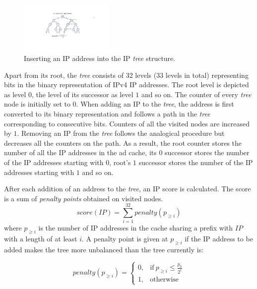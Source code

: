 \begin{figure}
    \centering
    \includegraphics[width=0.40\textwidth]{img/ip_tree_small}
    \vspace{-0.05in}
    \caption{Inserting an IP address into the IP \emph{tree} structure.}
    \label{fig:ip_tree}
    \vspace{-0.15in}
\end{figure}

Apart from its root, the \emph{tree} consists of 32 levels (33 levels in total) representing bits in the binary representation of IPv4 IP addresses. 
The root level is depicted as level $0$, the level of its successor as level $1$ and so on. 
The counter of every \emph{tree} node is initially set to $0$. When adding an IP to the \emph{tree}, the address is first converted to its binary representation and follows a path in the \emph{tree} corresponding to consecutive bits. 
Counters of all the visited nodes are increased by $1$. Removing an IP from the \emph{tree} follows the analogical procedure but decreases all the counters on the path. 
As a result, the root counter stores the number of all the IP addresses in the ad cache, its $0$ successor stores the number of the IP addresses starting with $0$, root's $1$ successor stores the number of the IP addresses starting with $1$ and so on. 

After each addition of an address to the \emph{tree}, an IP score is calculated.
The score is a sum of \emph{penalty points} obtained on visited nodes. 
$$\textit{score}(IP)=\sum_{i=1}^{32} \textit{penalty}(p_{\geq i}) $$
where $p_{\geq i}$ is the number of IP addresses in the cache sharing a prefix with $IP$ with a length of at least $i$. A penalty point is given at $p_{\geq i}$ if the IP address to be added makes the tree more unbalanced than the tree currently is:

\begin{equation}
    \textit{penalty}(p_{\geq i})=
    \begin{cases}
      0, & \text{if}\ p_{\geq i} \leq \frac{p_0}{2^i} \\
      1, & \text{otherwise}
    \end{cases}
  \end{equation}

